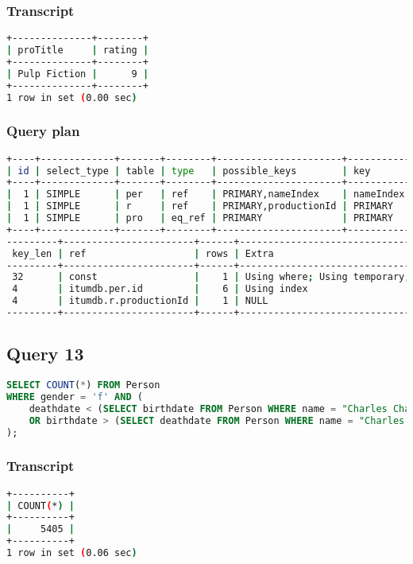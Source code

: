 \subsubsection{Transcript}
\begin{lstlisting}[language=bash]
+--------------+--------+
| proTitle     | rating |
+--------------+--------+
| Pulp Fiction |      9 |
+--------------+--------+
1 row in set (0.00 sec)
\end{lstlisting}

\subsubsection{Query plan}
\begin{lstlisting}[language=bash]
+----+-------------+-------+--------+----------------------+-----------+
| id | select_type | table | type   | possible_keys        | key       |
+----+-------------+-------+--------+----------------------+-----------+
|  1 | SIMPLE      | per   | ref    | PRIMARY,nameIndex    | nameIndex |
|  1 | SIMPLE      | r     | ref    | PRIMARY,productionId | PRIMARY   |
|  1 | SIMPLE      | pro   | eq_ref | PRIMARY              | PRIMARY   |
+----+-------------+-------+--------+----------------------+-----------+
---------+-----------------------+------+----------------------------------------------+
 key_len | ref                   | rows | Extra                                        |
---------+-----------------------+------+----------------------------------------------+
 32      | const                 |    1 | Using where; Using temporary; Using filesort |
 4       | itumdb.per.id         |    6 | Using index                                  |
 4       | itumdb.r.productionId |    1 | NULL                                         |
---------+-----------------------+------+----------------------------------------------+
\end{lstlisting}


\bigskip
\subsection{Query 13}
\begin{lstlisting}[language=sql]
SELECT COUNT(*) FROM Person
WHERE gender = 'f' AND (
	deathdate < (SELECT birthdate FROM Person WHERE name = "Charles Chaplin")
	OR birthdate > (SELECT deathdate FROM Person WHERE name = "Charles Chaplin")
);
\end{lstlisting}

\subsubsection{Transcript}
\begin{lstlisting}[language=bash]
+----------+
| COUNT(*) |
+----------+
|     5405 |
+----------+
1 row in set (0.06 sec)
\end{lstlisting}

